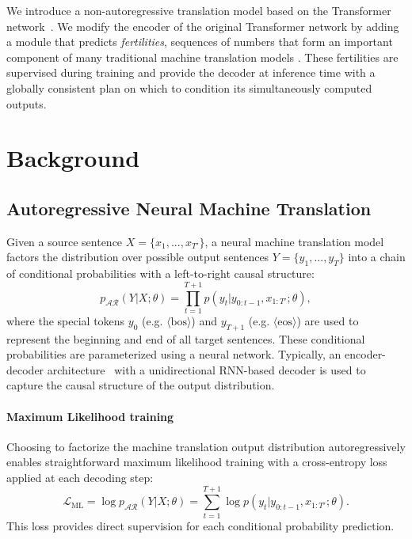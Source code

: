 \documentclass{article} \usepackage{iclr2018_conference,times}
\begin{document}
We introduce a non-autoregressive translation model based on the Transformer network~\citep{vaswani2017attention}. We modify the encoder of the original Transformer network by adding a module that predicts \emph{fertilities}, sequences of numbers that form an important component of many traditional machine translation models \citep{brown1993mathematics}.
These fertilities are supervised during training and provide the decoder at inference time with a globally consistent plan on which to condition its simultaneously computed outputs.

\section{Background}
\subsection{Autoregressive Neural Machine Translation}
Given a source sentence $X=\{x_1, ..., x_{T'}\}$, a neural machine translation model factors the distribution over possible output sentences $Y=\{y_1, ..., y_T\}$ into a chain of conditional probabilities with a left-to-right causal structure:
\begin{equation}
p_{\mathcal{AR}}(Y|X; \theta) = \prod_{t=1}^{T+1} p(y_t| y_{0:t-1}, x_{1:T'}; \theta),
\end{equation}
where the special tokens $y_0$ (e.g. $\langle \mathrm{bos}\rangle$) and $y_{T+1}$ (e.g. $\langle \mathrm{eos}\rangle$) are used to represent the beginning and end of all target sentences.
These conditional probabilities are parameterized using a neural network. Typically, an encoder-decoder architecture~\citep{sutskever2014sequence} with a unidirectional RNN-based decoder is used to capture the causal structure of the output distribution.

\vspace{-5pt}
\paragraph{Maximum Likelihood training}
Choosing to factorize the machine translation output distribution autoregressively enables straightforward maximum likelihood training with a cross-entropy loss applied at each decoding step:
\begin{equation}
\mathcal{L}_{\text{ML}} = \log p_{\mathcal{AR}}(Y|X; \theta) = \sum_{t=1}^{T+1}\log p(y_t|y_{0:t-1},x_{1:T'};\theta).
\end{equation}
This loss provides direct supervision for each conditional probability prediction.
\end{document}
